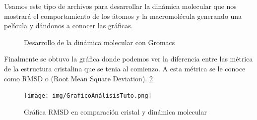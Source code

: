 \documentclass[a4paper,12pt]{article}
\begin{document}
         Usamos este tipo de archivos para desarrollar la dinámica molecular que nos mostrará el comportamiento de los átomos y la macromolécula generando una película y dándonos a conocer las gráficas.

         
         \begin{figure}[H]
            \begin{center}
                  \hspace{2cm}
              \caption{Desarrollo de la dinámica molecular con Gromacs}
              \label{Figura-Dinámica}
            \end{center}
          \end{figure}
          \vspace{0.5cm}

          Finalmente se obtuvo la gráfica donde podemos ver la diferencia entre las métrica de la estructura cristalina que se tenia al comienzo. A esta métrica se le conoce como RMSD o (Root Mean Square Deviation). \ref{RMSD}

          \begin{figure}[H]
            \centering
            \texttt{[image: img/GraficoAnálisisTuto.png]}
            \caption{Gráfica RMSD en comparación cristal y dinámica molecular}
            \label{RMSD}
          \end{figure}
          \vspace{0.5cm}
\end{document}
